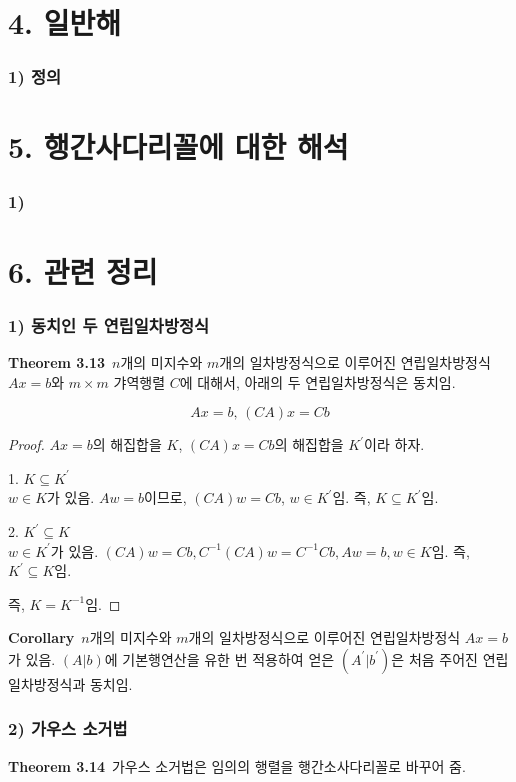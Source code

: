 \section*{4. 일반해}
\subsubsection*{1) 정의\\}


\section*{5. 행간사다리꼴에 대한 해석}
\subsubsection*{1) }


\section*{6. 관련 정리}
\subsubsection*{1) 동치인 두 연립일차방정식}
\textbf{Theorem 3.13}\, $n$개의 미지수와 $m$개의 일차방정식으로 이루어진 연립일차방정식 $Ax=b$와 $m \times m$ 갸역행렬 $C$에 대해서, 아래의 두 연립일차방정식은 동치임.

\[
Ax=b,\,(CA)x=Cb
\]

\begin{proof}
$Ax=b$의 해집합을 $K$, $(CA)x=Cb$의 해집합을 $K^{\prime}$이라 하자.

1. $K \subseteq K^{\prime}$\\
$w \in K$가 있음. $Aw=b$이므로, $(CA)w=Cb$, $w \in K^{\prime}$임. 즉, $K \subseteq K^{\prime}$임.

2. $K^{\prime} \subseteq K$\\
$w \in K^{\prime}$가 있음. $(CA)w=Cb, C^{-1}(CA)w=C^{-1}Cb, Aw=b, w \in K$임. 즉, $K^{\prime} \subseteq K$임.

즉, $K=K^{-1}$임.
\end{proof}

\textbf{Corollary}\, $n$개의 미지수와 $m$개의 일차방정식으로 이루어진 연립일차방정식 $Ax=b$가 있음. $(A|b)$에 기본행연산을 유한 번 적용하여 얻은 $(A^{\prime}|b^{\prime})$은 처음 주어진 연립일차방정식과 동치임.

\subsubsection*{2) 가우스 소거법}
\textbf{Theorem 3.14}\, 가우스 소거법은 임의의 행렬을 행간소사다리꼴로 바꾸어 줌.







\newpage

